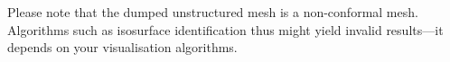 \noindent
Please note that the dumped unstructured mesh is a non-conformal mesh. 
Algorithms such as isosurface identification thus might yield invalid
results---it depends on your visualisation algorithms.


% 
% 
% 
% 
% 
% 
% 
% 
% 
% 
% 
% 
% 
% 
% 
% 
% 
% 
% 
% 
% 
% 
% 
% 
% 

